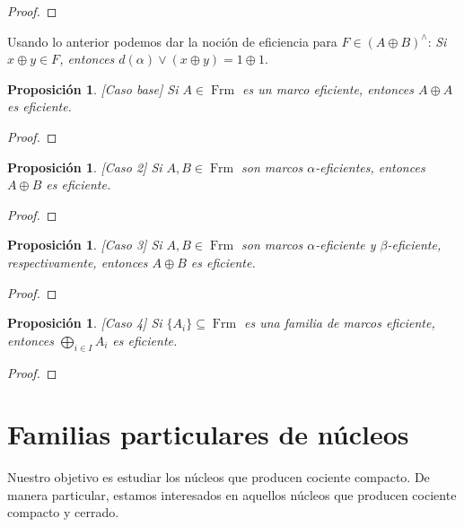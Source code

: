 \documentclass[11pt]{amsart}
\DeclareMathOperator{\Frm}{Frm}
\theoremstyle{plain}
\newtheorem{prop}[thm]{Proposición}
\theoremstyle{definition}
\begin{document}
\begin{proof}

\end{proof}

Usando lo anterior podemos dar la noción de eficiencia para $F\in (A\oplus B)^\wedge$:
\emph{Si $x\oplus y\in F$, entonces $d(\alpha)\vee (x\oplus y)=1\oplus 1$}.

\begin{prop}\label{Paso 1}{[Caso base]}
Si $A\in \Frm$ es un marco eficiente, entonces $A\oplus A$ es eficiente.
\end{prop}

\begin{proof}

\end{proof}

\begin{prop}\label{Paso 2}{[Caso 2]}
Si $A, B\in \Frm$ son marcos $\alpha$-eficientes, entonces $A\oplus B$ es eficiente.
\end{prop}

\begin{proof}

\end{proof}

\begin{prop}\label{Paso 3}{[Caso 3]}
Si $A, B\in \Frm$ son marcos $\alpha$-eficiente y $\beta$-eficiente, respectivamente, entonces $A\oplus B$ es eficiente.
\end{prop}

\begin{proof}

\end{proof}
\begin{prop}\label{Paso 4}{[Caso 4]}
Si $\{A_i\}\subseteq \Frm$ es una familia de marcos eficiente, entonces $\bigoplus_{i\in I} A_i$ es eficiente.
\end{prop}

\begin{proof}

\end{proof}

\section{Familias particulares de núcleos}
Nuestro objetivo es estudiar los núcleos que producen cociente compacto. De manera particular, estamos interesados en 
aquellos núcleos que producen cociente compacto y cerrado.\\
\end{document}
